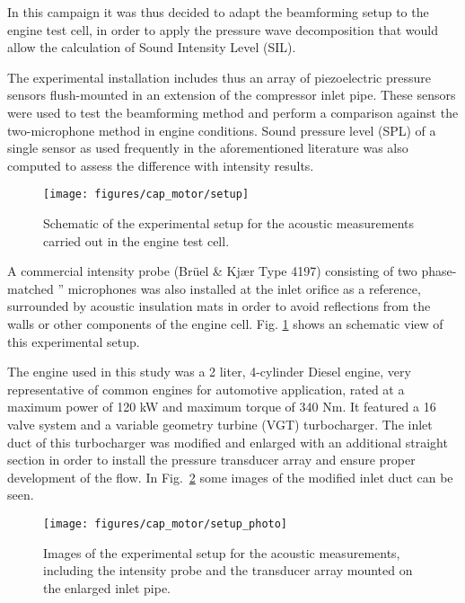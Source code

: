 In this campaign it was thus decided to adapt the beamforming setup to the engine test cell, in order to apply the pressure wave decomposition that would allow the calculation of Sound Intensity Level (SIL).

The experimental installation includes thus an array of piezoelectric pressure sensors flush-mounted in an extension of the compressor inlet pipe. These sensors were used to test the beamforming method and perform a comparison against the two-microphone method in engine conditions. Sound pressure level (SPL) of a single sensor as used frequently in the aforementioned literature was also computed to assess the difference with intensity results.

\begin{figure}[t!]
\centering
\null\hspace{1cm}
\texttt{[image: figures/cap\_motor/setup]}
\null\hspace{1cm}
\caption[Schematic of the setup in the engine test cell]{Schematic of the experimental setup for the acoustic measurements carried out in the engine test cell.}
\label{fig:setup}
\end{figure}

A commercial intensity probe (Brüel \& Kjær Type 4197) consisting of two phase-matched '' microphones was also installed at the inlet orifice as a reference, surrounded by acoustic insulation mats in order to avoid reflections from the walls or other components of the engine cell.  Fig. \ref{fig:setup} shows an schematic view of this  experimental setup.

The engine used in this study was a 2 liter, 4-cylinder Diesel engine, very representative of common engines for automotive application, rated at a maximum power of 120 kW and maximum torque of 340 Nm. It featured a 16 valve system and a variable geometry turbine (VGT) turbocharger. The inlet duct of this turbocharger was modified and enlarged with an additional straight section in order to install the pressure transducer array and ensure proper development of the flow. In Fig.~\ref{fig:setup_photo} some images of the modified inlet duct can be seen.

\begin{figure}[hbt!]
\centering
\texttt{[image: figures/cap\_motor/setup\_photo]}
\caption[Images of the experimental setup]{Images of the experimental setup for the acoustic measurements, including the intensity probe and the transducer array mounted on the enlarged inlet pipe.}
\label{fig:setup_photo}
\end{figure}


